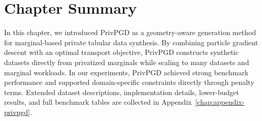 \FloatBarrier

\section{Chapter Summary}

In this chapter, we introduced PrivPGD as a geometry-aware generation method for marginal-based private tabular data synthesis. By combining particle gradient descent with an optimal transport objective, PrivPGD constructs synthetic datasets directly from privatized marginals while scaling to many datasets and marginal workloads. In our experiments, PrivPGD achieved strong benchmark performance and supported domain-specific constraints directly through penalty terms. Extended dataset descriptions, implementation details, lower-budget results, and full benchmark tables are collected in Appendix~\ref{chap:appendix-privpgd}.
